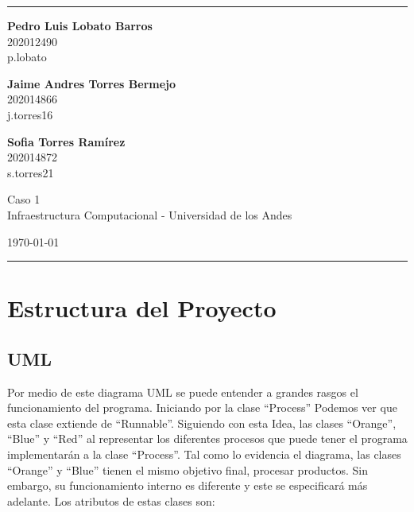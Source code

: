 \documentclass[a4paper]{article}
\begin{document}

\fancyhead[C]{}
\hrule \medskip %
\begin{minipage}{0.295\textwidth} 
\raggedright
\footnotesize
\textbf{Pedro Luis Lobato Barros} \hfill\\    
202012490\hfill\\
p.lobato

\textbf{Jaime Andres Torres Bermejo} \hfill\\   
202014866\hfill\\
j.torres16

\textbf{Sofia Torres Ramírez} \hfill\\   
202014872\hfill\\
s.torres21

\end{minipage}
\begin{minipage}{0.4\textwidth} 
\centering 
\large 
Caso 1\\ 
\normalsize 
Infraestructura Computacional - Universidad de los Andes\\ 
\end{minipage}
\begin{minipage}{0.295\textwidth} 
\raggedleft
\today\hfill\\
\end{minipage}
\medskip\hrule 
\bigskip


\section{Estructura del Proyecto}
    

    \subsection{UML}

    Por medio de este diagrama UML se puede entender a grandes rasgos el funcionamiento del programa. Iniciando por la clase “Process” Podemos ver que esta clase extiende de “Runnable”.  Siguiendo con esta Idea, las clases “Orange”, “Blue” y “Red” al representar los diferentes procesos que puede tener el programa implementarán a la clase “Process”. Tal como lo evidencia el diagrama, las clases “Orange” y “Blue” tienen el mismo objetivo final, procesar productos. Sin embargo, su funcionamiento interno es diferente y este se especificará más adelante. Los atributos de estas clases son:  
    
\end{document}
